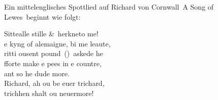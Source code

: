 \documentclass[a4paper, 12pt]{article} %
\begin{document}
Ein mittelenglisches \frq Spottlied auf Richard von Cornwall\flq\ 
\textbraceleft A Song of Lewes\textbraceright\
beginnt wie folgt:\par\medskip\noindent
\glqq Sitte\th alle stille \&\ herkne\th to me!\\
\th e kyng of alemaigne, bi me leaute,\\
\th ritti \th ousent pound~(\textsterling)~askede he\\
fforte make \th e pees in \th e countre,\\
\hspace*{4ex} ant so he dude more.\\
\hspace*{2ex} Richard, \th ah \th ou be euer trichard,\\
\hspace*{4ex} trichhen shalt \th ou neuermore!\grqq
\end{document}
